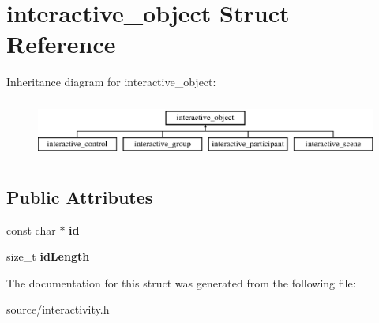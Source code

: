 \hypertarget{structinteractive__object}{}\section{interactive\+\_\+object Struct Reference}
\label{structinteractive__object}
Inheritance diagram for interactive\+\_\+object\+:\begin{figure}[H]
\begin{center}
\leavevmode
\includegraphics[height=1.931034cm]{structinteractive__object}
\end{center}
\end{figure}
\subsection*{Public Attributes}
\begin{DoxyCompactItemize}
\item 
\mbox{\label{structinteractive__object_a4dc1bc79b2c49a36176df507feb750a7}} 
const char $\ast$ {\bfseries id}
\item 
\mbox{\label{structinteractive__object_a787304bd5c30b4de4ff77f952c40f8c5}} 
size\+\_\+t {\bfseries id\+Length}
\end{DoxyCompactItemize}


The documentation for this struct was generated from the following file\+:\begin{DoxyCompactItemize}
\item 
source/interactivity.\+h\end{DoxyCompactItemize}
